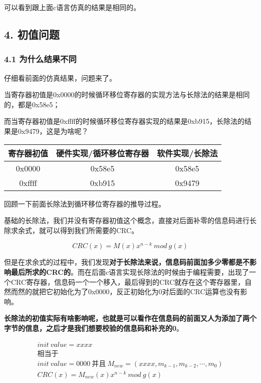 \documentclass[
]{article}
\begin{document}
可以看到跟上面c语言仿真的结果是相同的。

\hypertarget{header-n172}{%
\subsection{4. 初值问题}\label{header-n172}}

\hypertarget{header-n173}{%
\subsubsection{4.1 为什么结果不同}\label{header-n173}}

仔细看前面的仿真结果，问题来了。

当寄存器初值是0x0000的时候循环移位寄存器的实现方法与长除法的结果是相同的，都是0x58e5；

而当寄存器初值是0xffff的时候循环移位寄存器实现的结果是0xb915，长除法的结果是0x9479，这是为啥呢？

\begin{longtable}[]{@{}ccc@{}}
\toprule
寄存器初值 & 硬件实现/循环移位寄存器 & 软件实现/长除法\tabularnewline
\midrule
\endhead
0x0000 & 0x58e5 & 0x58e5\tabularnewline
0xffff & 0xb915 & 0x9479\tabularnewline
\bottomrule
\end{longtable}

回顾一下前面长除法到循环移位寄存器的推导过程。

基础的长除法，我们并没有寄存器初值这个概念，直接对后面补零的信息码进行长除求余式，就可以得到我们所需要的CRC。

\begin{equation}
CRC(x)=M(x)x^{n-k} \: mod \: g(x)
\end{equation}

但是在求余式的过程中，我们发现\textbf{对于长除法来说，信息码前面加多少零都是不影响最后所求的CRC的}。而在后面c语言实现长除法的时候由于编程需要，出现了一个CRC寄存器，信息码一个一个移入，最后得到的CRC就存在这个寄存器里，自然而然的就把它初始化为了0x0000，反正初始化为0对后面的CRC运算也没有影响。

\textbf{长除法的初值实际有啥影响呢，也就是可以看作在信息码的前面又人为添加了两个字节的信息，之后才是我们想要校验的信息码和补充的0}。

\begin{equation}
\begin{aligned}
init \: value = xxxx\\
相当于\\
init \: value = 0000 \: 并且\: M_{new} = (xxxx,m_{k-1},m_{k-2},\cdots,m_0)\\
CRC(x)=M_{new}(x)x^{n-k} \: mod \: g(x)
\end{aligned}
\end{equation}
\end{document}
